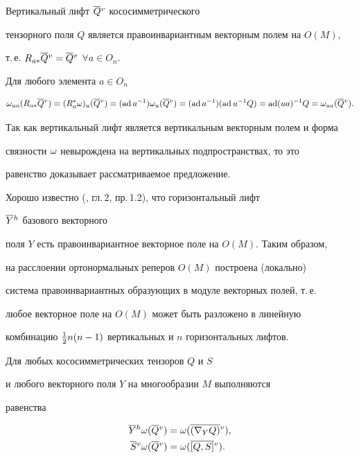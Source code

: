 \begin{props} Вертикальный лифт $\overline {Q}{}^v$ кососимметрического


тензорного поля $Q$ является правоинвариантным векторным полем на $O(M)$,


т.\,е. $R_{a*}\overline {Q}{}^v=\overline {Q}{}^v$ $\forall a\in O_n$. 


\end{props}





\begin{pf} Для любого элемента $a\in O_n$


$$


\w _{ua}(R_{a*}\olv Q)=(R_a^*\w )_u(\olv Q)=(\ad a^{-1})\w _u(\olv Q)=


(\ad a^{-1})(\ad u^{-1}Q)=


\ad (ua)^{-1}Q=\w _{ua}(\olv Q).


$$


Так как вертикальный лифт является вертикальным векторным полем и форма


связности $\omega $ невырождена на вертикальных подпространствах, то это


равенство доказывает рассматриваемое предложение.


\end{pf}





Хорошо известно (\cite{Kob1}, гл.\,2, пр.\,1.2), что горизонтальный лифт


$\overline {Y}{}^h$ базового векторного


поля $Y$ есть правоинвариантное векторное поле на $O(M)$. Таким образом,


на расслоении ортонормальных реперов $O(M)$ построена (локально)


система правоинвариантных образующих в модуле векторных полей, т.\,е.


любое векторное поле на $O(M)$ может быть разложено в линейную


комбинацию $\frac12 n(n-1)$ вертикальных и $n$ горизонтальных лифтов.





\begin{lems} Для любых кососимметрических тензоров $Q$ и $S$


и любого векторного поля $Y$ на многообразии $M$ выполняются


равенства


\begin{align}


\olh Y\w (\olv Q)&=\w (\olv {(\n YQ)}),\\


\olv S\w (\olv Q)&=\w (\olv {[Q,S]}).


\end{align}


\end{lems}





